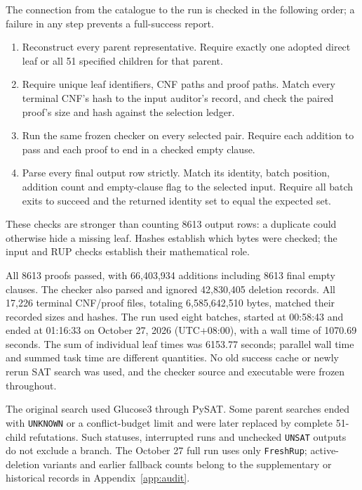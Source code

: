 The connection from the catalogue to the run is checked in the following
order; a failure in any step prevents a full-success report.
\begin{enumerate}
\item Reconstruct every parent representative. Require exactly one
adopted direct leaf or all 51 specified children for that parent.
\item Require unique leaf identifiers, CNF paths and proof paths. Match
every terminal CNF's hash to the input auditor's record, and check the
paired proof's size and hash against the selection ledger.
\item Run the same frozen checker on every selected pair. Require each
addition to pass and each proof to end in a checked empty clause.
\item Parse every final output row strictly. Match its identity, batch
position, addition count and empty-clause flag to the selected input.
Require all batch exits to succeed and the returned identity set to equal
the expected set.
\end{enumerate}
These checks are stronger than counting 8613 output rows: a duplicate
could otherwise hide a missing leaf. Hashes establish which bytes were
checked; the input and RUP checks establish their mathematical role.

All 8613 proofs passed, with 66,403,934 additions including 8613 final
empty clauses. The checker also parsed and ignored 42,830,405 deletion
records. All 17,226 terminal CNF/proof files, totaling 6,585,642,510 bytes,
matched their recorded sizes and hashes. The run used eight batches,
started at 00:58:43 and ended at 01:16:33 on October 27, 2026
(UTC+08:00), with a wall time of 1070.69 seconds. The sum of individual
leaf times was 6153.77 seconds; parallel wall time and summed task time
are different quantities. No old success cache or newly rerun SAT search
was used, and the checker source and executable were frozen throughout.

The original search used Glucose3 through PySAT. Some parent searches
ended with \texttt{UNKNOWN} or a conflict-budget limit and were later
replaced by complete 51-child refutations. Such statuses, interrupted
runs and unchecked \texttt{UNSAT} outputs do not exclude a branch.
The October 27 full run uses only \texttt{FreshRup}; active-deletion
variants and earlier fallback counts belong to the supplementary or
historical records in Appendix~\ref{app:audit}.
